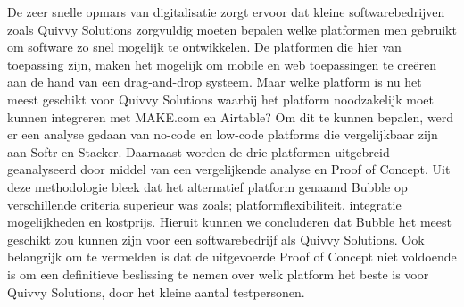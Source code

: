 De zeer snelle opmars van digitalisatie zorgt ervoor dat kleine softwarebedrijven zoals Quivvy Solutions zorgvuldig 
moeten bepalen welke platformen men gebruikt om software zo snel mogelijk te ontwikkelen.
 De platformen die hier van toepassing zijn, maken het mogelijk om mobile en web toepassingen 
 te creëren aan de hand van een drag-and-drop systeem. Maar welke platform is nu het meest geschikt voor Quivvy Solutions waarbij het 
 platform noodzakelijk moet kunnen integreren met MAKE.com en Airtable? Om dit te kunnen bepalen, werd er een analyse gedaan van no-code en low-code platforms die 
 vergelijkbaar zijn aan Softr en Stacker. Daarnaast worden de drie platformen uitgebreid geanalyseerd door middel van een vergelijkende analyse en Proof of Concept. 
 Uit deze methodologie bleek dat het alternatief platform genaamd Bubble op verschillende criteria superieur was zoals; platformflexibiliteit, integratie mogelijkheden 
 en kostprijs. Hieruit kunnen we concluderen dat Bubble het meest geschikt zou kunnen zijn voor een softwarebedrijf als Quivvy Solutions. 
 Ook belangrijk om te vermelden is dat de uitgevoerde Proof of Concept niet voldoende is om een definitieve beslissing te 
 nemen over welk platform het beste is voor Quivvy Solutions, door het kleine aantal testpersonen.
